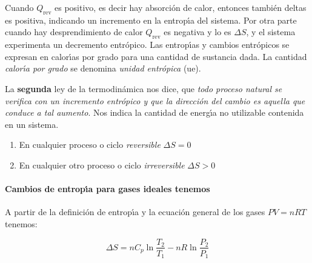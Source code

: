 Cuando $Q _{\mathrm{rev}}$ es positivo, es decir hay absorci\'on de calor, entonces tambi\'en \gls{deltas} es positiva, indicando un incremento en la entrop\'{\i}a del sistema. Por otra parte cuando hay desprendimiento de calor  $Q _{\mathrm{rev}}$ es negativa y lo es $\Delta S$, y el
sistema experimenta un decremento entr\'opico. Las entrop\'{\i}as y cambios entr\'opicos se expresan en  calor\'{\i}as por grado para una cantidad de sustancia dada. La cantidad \textit{calor\'{\i}a por grado} se denomina \textit{unidad
entr\'opica} (ue).

La \textbf{segunda} ley de la termodin\'amica nos dice,
que \textit{todo proceso natural se verifica con un incremento entr\'opico y que la
direcci\'on del cambio es aquella que conduce a tal aumento}. Nos indica la cantidad de energ\'{\i}a no utilizable contenida en un sistema.

\begin{enumerate}
\item En cualquier proceso o ciclo \textit{reversible} $\Delta S = 0$
\item En cualquier otro proceso o ciclo \textit{irreversible} $\Delta S > 0$
\end{enumerate}

\paragraph{Cambios de entrop\'{\i}a para gases ideales tenemos}  A partir de la definici\'on de entrop\'{\i}a y la ecuaci\'on general de
los gases $PV = nRT$ tenemos:

\begin{equation}
\Delta S = n C_p \ln \frac{T_2}{T_1} -nR\ln \frac{P_2}{P_1}
\end{equation}

